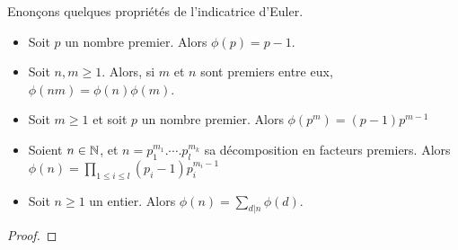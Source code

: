 Enonçons quelques propriétés de l'indicatrice d'Euler.

\begin{proposition}
	\begin{itemize}
		\item Soit $p$ un nombre premier. Alors $\phi(p) = p - 1$.
		\item Soit $n, m \geq 1$. Alors, si $m$ et $n$ sont premiers entre eux,
			$\phi(n m) = \phi(n) \phi(m)$.
		\item Soit $m \geq 1$ et soit $p$ un nombre premier. Alors $\phi(p^{m})
			= (p - 1) p^{m - 1}$
		\item Soient $n \in \mathbb{N}$, et $n = p_{1}^{m_{1}} . \cdots .
			p_{l}^{m_{k}}$ sa décomposition en facteurs premiers. Alors
			$\phi(n) = \displaystyle \prod_{1 \leq i \leq l} (p_{i} - 1)
			p_{i}^{m_{i} - 1}$
		\item Soit $n \geq 1$ un entier. Alors $\phi(n) = \displaystyle \sum_{d | n}
			\phi(d)$.
	\end{itemize}
\end{proposition}

\ifdefined\outputproof
\begin{proof}

\end{proof}
\fi





